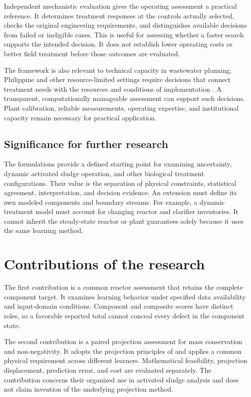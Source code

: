 Independent mechanistic evaluation gives the operating assessment a practical reference. It determines treatment responses at the controls actually selected, checks the original engineering requirements, and distinguishes available decisions from failed or ineligible cases. This is useful for assessing whether a faster search supports the intended decision. It does not establish lower operating costs or better field treatment before those outcomes are evaluated.

The framework is also relevant to technical capacity in wastewater planning. Philippine and other resource-limited settings require decisions that connect treatment needs with the resources and conditions of implementation \citep{Tabios2020,DamalerioBarriers2022,Ulrich2009}. A transparent, computationally manageable assessment can support such decisions. Plant calibration, reliable measurements, operating expertise, and institutional capacity remain necessary for practical application.

\subsection{Significance for further research}

The formulations provide a defined starting point for examining uncertainty, dynamic activated sludge operation, and other biological treatment configurations. Their value is the separation of physical constraints, statistical agreement, interpretation, and decision evidence. An extension must define its own modeled components and boundary streams. For example, a dynamic treatment model must account for changing reactor and clarifier inventories. It cannot inherit the steady-state reactor or plant guarantees solely because it uses the same learning method.

\section{Contributions of the research}

The first contribution is a common reactor assessment that retains the complete component target. It examines learning behavior under specified data availability and input-domain conditions. Component and composite scores have distinct roles, so a favorable reported total cannot conceal every defect in the component state.

The second contribution is a paired projection assessment for mass conservation and non-negativity. It adopts the projection principles of \citet{KircherVotsmeier2025} and applies a common physical requirement across different learners. Mathematical feasibility, projection displacement, prediction error, and cost are evaluated separately. The contribution concerns their organized use in activated sludge analysis and does not claim invention of the underlying projection method.


